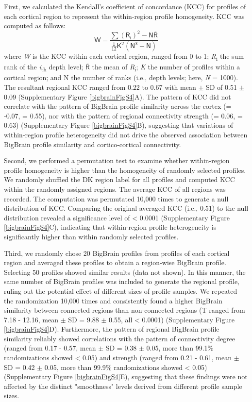 \begin{refsection}
First, we calculated the Kendall's coefficient of concordance (KCC) for profiles of each cortical region to represent the within-region profile homogeneity. KCC was computed as follows:
\[
\mathsf{W = \frac{\sum (R_{i})^{2} - N\overline{R}}{\frac{1}{12} K^{2}(N^{3} - N)}}
\]
where \textit{W} is the KCC within each cortical region, ranged from 0 to 1; \textit{R}\textsubscript{i} the sum rank of the \textit{i}\textsubscript{th} depth level; $\mathsf{\overline{R}}$ the mean of \textit{R}\textsubscript{i}; \textit{K} the number of profiles within a cortical region; and N the number of ranks (i.e., depth levels; here, \textit{N} = 1000). The resultant regional KCC ranged from 0.22 to 0.67 with mean $\pm$ SD of 0.51 $\pm$ 0.09 (Supplementary Figure \ref{bigbrainFigS4}A). The pattern of KCC did not correlate with the pattern of BigBrain profile similarity across the cortex (\rval = -0.07, \pval = 0.55), nor with the pattern of regional connectivity strength (\rval = 0.06, \pval = 0.63) (Supplementary Figure \ref{bigbrainFigS4}B), suggesting that variations of within-region profile heterogeneity did not drive the observed association between BigBrain profile similarity and cortico-cortical connectivity.

Second, we performed a permutation test to examine whether within-region profile homogeneity is higher than the homogeneity of randomly selected profiles. We randomly shuffled the DK region label for all profiles and computed KCC within the randomly assigned regions. The average KCC of all regions was recorded. The computation was permutated 10,000 times to generate a null distribution of KCC. Comparing the original averaged KCC (i.e., 0.51) to the null distribution revealed a significance level of \pval < 0.0001 (Supplementary Figure \ref{bigbrainFigS4}C), indicating that within-region profile heterogeneity is significantly higher than within randomly selected profiles.

Third, we randomly chose 20 BigBrain profiles from profiles of each cortical region and averaged these profiles to obtain a region-wise BigBrain profile. Selecting 50 profiles showed similar results (data not shown). In this manner, the same number of BigBrain profiles was included to generate the regional profile, ruling out the potential effect of different sizes of profile samples. We repeated the randomization 10,000 times and consistently found a higher BigBrain similarity between connected regions than non-connected regions (T ranged from 7.18 - 12.16, mean $\pm$ SD = 9.88 $\pm$ 0.55, all \pval < 0.0001) (Supplementary Figure \ref{bigbrainFigS4}D). Furthermore, the pattern of regional BigBrain profile similarity reliably showed correlations with the pattern of connectivity degree (\rval ranged from 0.17 - 0.57, mean $\pm$ SD = 0.38 $\pm$ 0.05, more than 99.1\% randomizations showed \pval < 0.05) and strength (\rval ranged from 0.21 - 0.61, mean $\pm$ SD = 0.42 $\pm$ 0.05, more than 99.9\% randomizations showed \pval < 0.05) (Supplementary Figure \ref{bigbrainFigS4}E), suggesting that these findings were not affected by the distinct "smoothness" levels derived from different profile sample sizes.


\end{refsection}
